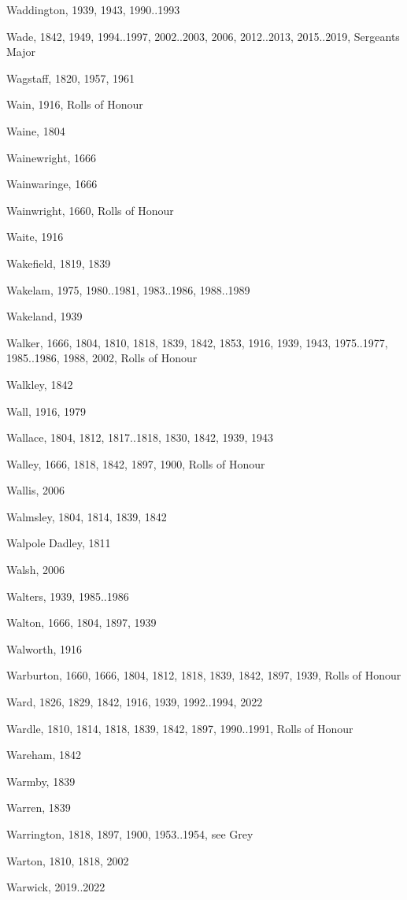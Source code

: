 {\begin{theindex}
\item Waddington, 1939, 1943, 1990..1993
\item Wade, 1842, 1949, 1994..1997, 2002..2003, 2006, 2012..2013, 2015..2019, Sergeants Major
\item Wagstaff, 1820, 1957, 1961
\item Wain, 1916, Rolls of Honour
\item Waine, 1804
\item Wainewright, 1666
\item Wainwaringe, 1666
\item Wainwright, 1660, Rolls of Honour
\item Waite, 1916
\item Wakefield, 1819, 1839
\item Wakelam, 1975, 1980..1981, 1983..1986, 1988..1989
\item Wakeland, 1939
\item Walker, 1666, 1804, 1810, 1818, 1839, 1842, 1853, 1916, 1939, 1943, 1975..1977, 1985..1986, 1988, 2002, Rolls of Honour
\item Walkley, 1842
\item Wall, 1916, 1979
\item Wallace, 1804, 1812, 1817..1818, 1830, 1842, 1939, 1943
\item Walley, 1666, 1818, 1842, 1897, 1900, Rolls of Honour
\item Wallis, 2006
\item Walmsley, 1804, 1814, 1839, 1842
\item Walpole Dadley, 1811
\item Walsh, 2006
\item Walters, 1939, 1985..1986
\item Walton, 1666, 1804, 1897, 1939
\item Walworth, 1916
\item Warburton, 1660, 1666, 1804, 1812, 1818, 1839, 1842, 1897, 1939, Rolls of Honour
\item Ward, 1826, 1829, 1842, 1916, 1939, 1992..1994, 2022
\item Wardle, 1810, 1814, 1818, 1839, 1842, 1897, 1990..1991, Rolls of Honour
\item Wareham, 1842
\item Warmby, 1839
\item Warren, 1839
\item Warrington, 1818, 1897, 1900, 1953..1954, see Grey
\item Warton, 1810, 1818, 2002
\item Warwick, 2019..2022

\end{theindex}}

